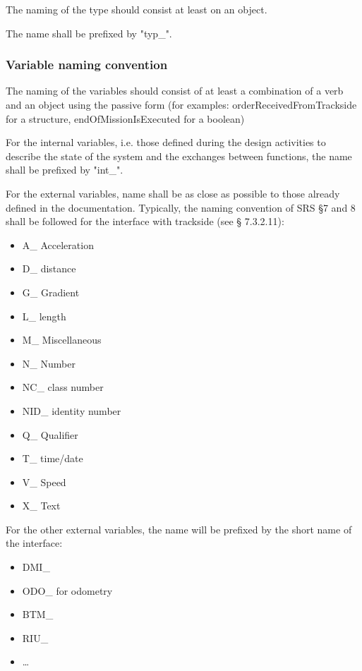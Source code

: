 The naming of the type should consist at least on an object.

The name shall be prefixed by "typ\_".

\subsubsection{Variable naming convention}

The naming of the variables should consist of at least a combination of a verb and an object using the passive form (for examples:   orderReceivedFromTrackside for a structure,     endOfMissionIsExecuted for a boolean)

For the internal variables, i.e. those defined during the design activities to describe the state of the system and the exchanges between functions, the name shall be prefixed by "int\_".

For the external variables, name shall be as close as possible to those already defined in the documentation.
Typically, the naming convention of SRS §7 and 8 shall be followed for the interface with trackside (see § 7.3.2.11):

\begin{itemize}
\item A\_ Acceleration
\item D\_ distance
\item G\_ Gradient
\item L\_ length
\item M\_ Miscellaneous
\item N\_ Number
\item NC\_ class number
\item NID\_ identity number
\item Q\_ Qualifier
\item T\_ time/date
\item V\_ Speed
\item X\_ Text
\end{itemize}

For the other external  variables, the name will be prefixed by the short name of the interface:

\begin{itemize}
\item DMI\_
\item ODO\_ for odometry
\item BTM\_
\item RIU\_
\item \dots
\end{itemize}

